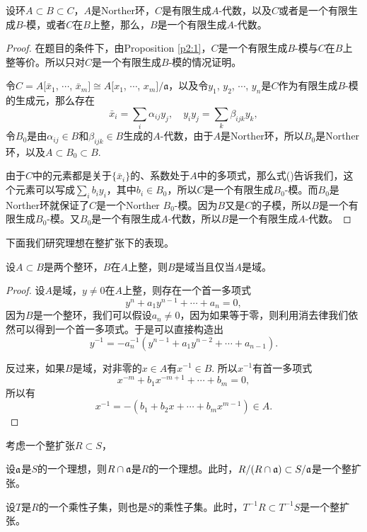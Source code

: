 \begin{pro}\label{p:2.4}
设环$A\subset B\subset C$，$A$是Norther环，$C$是有限生成$A$-代数，以及$C$或者是一个有限生成$B$-模，或者$C$在$B$上整，那么，$B$是一个有限生成$A$-代数。
\end{pro}

\begin{proof} 
	在题目的条件下，由Proposition \ref{p2:1}，$C$是一个有限生成$B$-模与$C$在$B$上整等价。所以只对$C$是一个有限生成$B$-模的情况证明。

	令$C=A[\bar{x}_1$, $\cdots$, $\bar{x}_m]\cong A[x_1$, $\cdots$, $x_m]/\mathfrak{a}$，以及令$y_1$, $y_2$, $\cdots$, $y_n$是$C$作为有限生成$B$-模的生成元，那么存在
	\begin{equation}
		\bar{x}_i=\sum_i\alpha_{ij}y_j,\quad y_iy_j=\sum_{k}\beta_{ijk}y_k,
	\end{equation}
	令$B_0$是由$\alpha_{ij}\in B$和$\beta_{ijk}\in B$生成的$A$-代数，由于$A$是Norther环，所以$B_0$是Norther环，以及$A\subset B_0 \subset B$.

	由于$C$中的元素都是关于$\{\bar{x}_i\}$的、系数处于$A$中的多项式，那么式(\theequation)告诉我们，这个元素可以写成$\sum_i b_i y_i$，其中$b_i\in B_0$，所以$C$是一个有限生成$B_0$-模。而$B_0$是Norther环就保证了$C$是一个Norther $B_0$-模。因为$B$又是$C$的子模，所以$B$是一个有限生成$B_0$-模。又$B_0$是一个有限生成$A$-代数，所以$B$是一个有限生成$A$-代数。
\end{proof}

下面我们研究理想在整扩张下的表现。

\begin{pro}
    \label{intfield} 设$A\subset B$是两个整环，$B$在$A$上整，则$B$是域当且仅当$A$是域。
\end{pro}

\begin{proof}
    设$A$是域，$y\neq 0$在$A$上整，则存在一个首一多项式
    \[
        y^n+a_1y^{n-1}+\cdots+a_n=0,
    \]
    因为$B$是一个整环，我们可以假设$a_n\neq 0$，因为如果等于零，则利用消去律我们依然可以得到一个首一多项式。于是可以直接构造出
    \[
        y^{-1}=-a_n^{-1}(y^{n-1}+a_1y^{n-2}+\cdots+a_{n-1}).
    \]

    反过来，如果$B$是域，对非零的$x\in A$有$x^{-1}\in B$. 所以$x^{-1}$有首一多项式
    \[
        x^{-m}+b_1x^{-m+1}+\cdots+b_m=0,
    \]
    所以有
    \[
        x^{-1}=-(b_1+b_2x+\cdots+b_mx^{m-1})\in A.
    \]
\end{proof}

\begin{lem}考虑一个整扩张$R\subset S$，
    \begin{compactenum}[~~~(1)]
        \item 设$\mathfrak{a}$是$S$的一个理想，则$R\cap \mathfrak{a}$是$R$的一个理想。此时，$R/(R\cap \mathfrak{a})\subset S/\mathfrak{a}$是一个整扩张。
        \item 设$T$是$R$的一个乘性子集，则也是$S$的乘性子集。此时，$T^{-1}R\subset T^{-1}S$是一个整扩张。
    \end{compactenum}
\end{lem}

